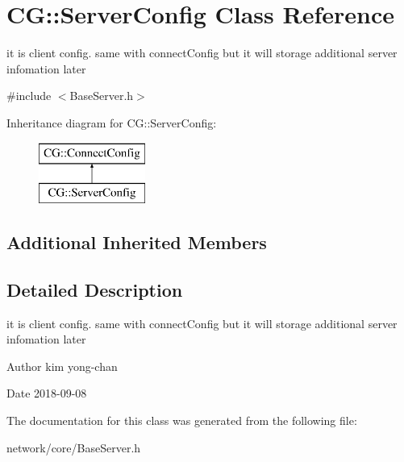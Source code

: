 \hypertarget{class_c_g_1_1_server_config}{}\section{CG\+:\+:Server\+Config Class Reference}
\label{class_c_g_1_1_server_config}


it is client config. same with connect\+Config but it will storage additional server infomation later  




{\ttfamily \#include $<$Base\+Server.\+h$>$}

Inheritance diagram for CG\+:\+:Server\+Config\+:\begin{figure}[H]
\begin{center}
\leavevmode
\includegraphics[height=2.000000cm]{class_c_g_1_1_server_config}
\end{center}
\end{figure}
\subsection*{Additional Inherited Members}


\subsection{Detailed Description}
it is client config. same with connect\+Config but it will storage additional server infomation later 

\begin{DoxyAuthor}{Author}
kim yong-\/chan 
\end{DoxyAuthor}
\begin{DoxyDate}{Date}
2018-\/09-\/08 
\end{DoxyDate}


The documentation for this class was generated from the following file\+:\begin{DoxyCompactItemize}
\item 
network/core/Base\+Server.\+h\end{DoxyCompactItemize}
